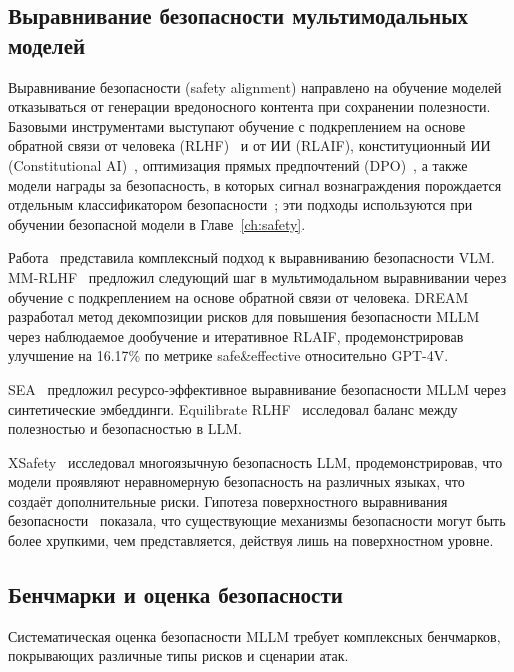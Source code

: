 \subsection{Выравнивание безопасности мультимодальных моделей}\label{subsec:safety_alignment}

Выравнивание безопасности (safety alignment) направлено на обучение моделей отказываться от генерации вредоносного контента при сохранении полезности. Базовыми инструментами выступают обучение с подкреплением на основе обратной связи от человека (RLHF)~\cite{bai2022hhrlhf} и от ИИ (RLAIF), конституционный ИИ (Constitutional AI)~\cite{bai2022cai}, оптимизация прямых предпочтений (DPO)~\cite{rafailov2023dpo}, а также модели награды за безопасность, в которых сигнал вознаграждения порождается отдельным классификатором безопасности~\cite{2510.14276}; эти подходы используются при обучении безопасной модели в Главе~\ref{ch:safety}.

Работа~\cite{2405.13581} представила комплексный подход к выравниванию безопасности VLM. MM-RLHF~\cite{2502.10391} предложил следующий шаг в мультимодальном выравнивании через обучение с подкреплением на основе обратной связи от человека. DREAM~\cite{2504.18053} разработал метод декомпозиции рисков для повышения безопасности MLLM через наблюдаемое дообучение и итеративное RLAIF, продемонстрировав улучшение на 16.17\% по метрике safe\&effective относительно GPT-4V.

SEA~\cite{2502.12562} предложил ресурсо-эффективное выравнивание безопасности MLLM через синтетические эмбеддинги. Equilibrate RLHF~\cite{equilibrate-rlhf-towards-balancing-helpfulness-safety-trade-off-in-large-languag} исследовал баланс между полезностью и безопасностью в LLM.

XSafety~\cite{2310.00905} исследовал многоязычную безопасность LLM, продемонстрировав, что модели проявляют неравномерную безопасность на различных языках, что создаёт дополнительные риски. Гипотеза поверхностного выравнивания безопасности~\cite{2410.10862} показала, что существующие механизмы безопасности могут быть более хрупкими, чем представляется, действуя лишь на поверхностном уровне.

\subsection{Бенчмарки и оценка безопасности}\label{subsec:safety_benchmarks}

Систематическая оценка безопасности MLLM требует комплексных бенчмарков, покрывающих различные типы рисков и сценарии атак.

